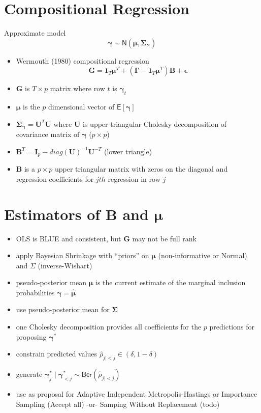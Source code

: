 \documentclass[
]{report}
\newcommand{\E}{\textsf{E}}
\newcommand{\N}{\textsf{N}}
\newcommand{\Ber}{\textsf{Ber}}
\newcommand{\eps}{\boldsymbol{\epsilon}}
\newcommand{\1}{\mathbf{1}_n}
\newcommand{\I}{\mathbf{I}}
\def\U{\mathbf{U}}
\def\one{\mathbf{1}}
\newcommand{\B}{\mathbf{B}}
\def\mub{\boldsymbol{\mu}}
\def\g{\boldsymbol{\gamma}}
\def\G{\boldsymbol{\Gamma}}
\def\Gbf{\mathbf{G}}
\def\Sigmab{\boldsymbol{\Sigma}}
\begin{document}
\section{Compositional Regression}\label{compositional-regression}

Approximate model \[\g \sim \N(\mub, \Sigmab_{\g})\]

\begin{itemize}
\item
  Wermouth (1980) compositional regression
  \[ \Gbf = \one_{T} \mub^T + (\G - \one_T \mub^T) \B + \eps
  \]
\item
  \(\Gbf\) is \(T \times p\) matrix where row \(t\) is \(\g_t\)
\item
  \(\mub\) is the \(p\) dimensional vector of \(\E[\g]\)
\item
  \(\Sigmab_{\g} = \U^T \U\) where \(\U\) is upper triangular Cholesky
  decomposition of covariance matrix of \(\g\) (\(p \times p\))
\item
  \(\B^T = \I_p -  diag(\U)^{-1} \U^{-T}\) (lower triangle)
\item
  \(\B\) is a \(p \times p\) upper triangular matrix with zeros on the
  diagonal and regression coefficients for \(jth\) regression in row
  \(j\)
\end{itemize}

\section{\texorpdfstring{Estimators of \(\B\) and
\(\mub\)}{Estimators of \textbackslash B and \textbackslash mub}}\label{estimators-of-b-and-mub}

\begin{itemize}
\item
  OLS is BLUE and consistent, but \(\Gbf\) may not be full rank
\item
  apply Bayesian Shrinkage with ``priors'' on \(\mub\) (non-informative
  or Normal) and \(\Sigma\) (inverse-Wishart)
\item
  pseudo-posterior mean \(\mub\) is the current estimate of the marginal
  inclusion probabilities \(\bar{\g} = \hat{\mub}\)
\item
  use pseudo-posterior mean for \(\Sigmab\)
\item
  one Cholesky decomposition provides all coefficients for the \(p\)
  predictions for proposing \(\g^*\)
\item
  constrain predicted values
  \(\hat{\rho}_{j \mid <j} \in (\delta, 1-\delta)\)
\item
  generate \(\g^*_j \mid \g^*_{< j} \sim \Ber(\hat{\rho}_{j \mid <j})\)
\item
  use as proposal for Adaptive Independent Metropolis-Hastings or
  Importance Sampling (Accept all) -or- Samping Without Replacement
  (todo)
\end{itemize}
\end{document}
